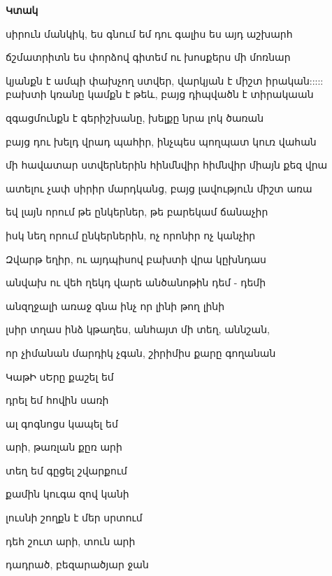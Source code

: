                                \centerline {\bf Կտակ}



                սիրուն մանկիկ, ես գնում եմ դու գալիս ես այդ աշխարհ

                     ճշմատրիտն ես փորձով գիտեմ ու  խոսքերս մի մոռնար

                       կյանքն է ամպի փախչող ստվեր, վարկյան է միշտ իրական:::::
                       բախտի կռանը կամքն  է թեև, բայց դիպվածն է տիրակաան


                       զգացմունքն է գերիշխանը, խելքը նրա լոկ ծառան


                       բայց դու խելդ վրադ պահիր,  ինչպես պողպատ կուռ վահան

                  մի հավատար ստվերներին  հինմնվիր  հիմնվիր միայն քեզ վրա


                    ատելու չափ սիրիր մարդկանց, բայց լավություն միշտ  առա

              եվ լայն որում թե ընկերներ, թե բարեկամ ճանաչիր


              իսկ նեղ  որում ընկերներին, ոչ որոնիր ոչ կանչիր

            Զվարթ եղիր,   ու այդպիսով բախտի վրա կըխնդաս


            անվախ ու վեհ ղեկդ  վարե անծանոթին դեմ - դեմի


            անզղջալի առաջ գնա ինչ որ լինի թող լինի 

            լսիր տղաս ինձ կթաղես, անհայտ մի տեղ, աննշան,


            որ  չիմանան մարդիկ չգան, շիրիմիս քարը գողանան


                    \cenrerline {***}

                     ԿաթԻ սԵրը  քաշել   եմ

                        դրել եմ հովին սառի

                        ալ գոգնոցս կապել եմ

                        արի, թառլան քըռ արի



                           տեղ եմ գըցել շվարքում

                           քամին կուգա զով կանի 
                                                  
                         լուսնի շողքն է մեր սրտում

                         դեհ շուտ արի, տուն արի


                         դադրած, բեզարածյար  ջան



